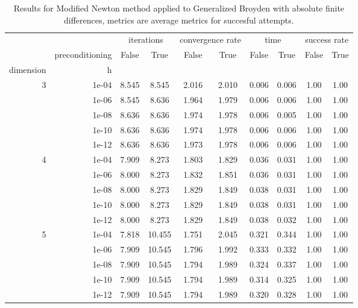 \begin{table}
\centering
\caption{Results for Modified Newton method applied to Generalized Broyden with absolute finite differences, metrics are average metrics for succesful attempts.}
\label{tab:Modified_Newton_Generalized_Broyden_fd_abs}
\begin{tabular}{rr|cc|cc|cc|cc}
\toprule
    &  & \multicolumn{2}{|c}{iterations} & \multicolumn{2}{|c}{convergence rate} & \multicolumn{2}{|c}{time} & \multicolumn{2}{|c}{success rate} \\
    & preconditioning & False & True & False & True & False & True & False & True \\
dimension & h &  &  &  &  &  &  &  &  \\
\midrule
\multirow[t]{5}{*}{3} & 1e-04 & 8.545 & 8.545 & 2.016 & 2.010 & 0.006 & 0.006 & 1.00 & 1.00 \\
    & 1e-06 & 8.545 & 8.636 & 1.964 & 1.979 & 0.006 & 0.006 & 1.00 & 1.00 \\
    & 1e-08 & 8.636 & 8.636 & 1.974 & 1.978 & 0.006 & 0.005 & 1.00 & 1.00 \\
    & 1e-10 & 8.636 & 8.636 & 1.974 & 1.978 & 0.006 & 0.006 & 1.00 & 1.00 \\
    & 1e-12 & 8.636 & 8.636 & 1.973 & 1.978 & 0.006 & 0.006 & 1.00 & 1.00 \\
\cline{1-10}
\multirow[t]{5}{*}{4} & 1e-04 & 7.909 & 8.273 & 1.803 & 1.829 & 0.036 & 0.031 & 1.00 & 1.00 \\
    & 1e-06 & 8.000 & 8.273 & 1.832 & 1.851 & 0.036 & 0.031 & 1.00 & 1.00 \\
    & 1e-08 & 8.000 & 8.273 & 1.829 & 1.849 & 0.038 & 0.031 & 1.00 & 1.00 \\
    & 1e-10 & 8.000 & 8.273 & 1.829 & 1.849 & 0.038 & 0.031 & 1.00 & 1.00 \\
    & 1e-12 & 8.000 & 8.273 & 1.829 & 1.849 & 0.038 & 0.032 & 1.00 & 1.00 \\
\cline{1-10}
\multirow[t]{5}{*}{5} & 1e-04 & 7.818 & 10.455 & 1.751 & 2.045 & 0.321 & 0.344 & 1.00 & 1.00 \\
    & 1e-06 & 7.909 & 10.545 & 1.796 & 1.992 & 0.333 & 0.332 & 1.00 & 1.00 \\
    & 1e-08 & 7.909 & 10.545 & 1.794 & 1.989 & 0.324 & 0.337 & 1.00 & 1.00 \\
    & 1e-10 & 7.909 & 10.545 & 1.794 & 1.989 & 0.314 & 0.325 & 1.00 & 1.00 \\
    & 1e-12 & 7.909 & 10.545 & 1.794 & 1.989 & 0.320 & 0.328 & 1.00 & 1.00 \\
\cline{1-10}
\bottomrule
\end{tabular}
\end{table}

